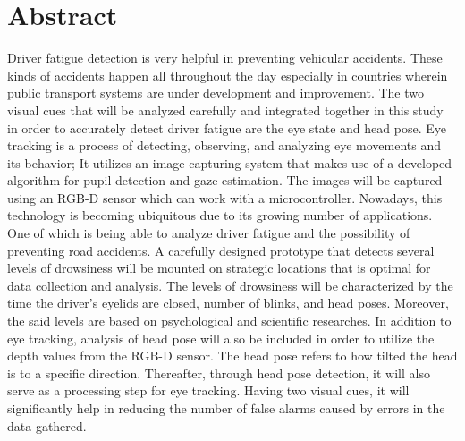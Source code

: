 \chapter*{Abstract}

\begin{comment}
Keep your abstract short by giving the gist/nutshell of your \MakeTextLowercase{\documentType}.	 Use the following checklist questions to help you in crafting your abstract.	

\begin{itemize}
	\item[$\square$] Did you briefly state what you intend to do?  
	\item[$\square$] Did you concisely discuss the problem statement?
	\item[$\square$] Did you tersely mention the objectives in general terms? 
	\item[$\square$] Did you succinctly describe the methodology for the target audience?
	\item[$\square$] Did you strongly describe your significant results and your conclusions?
\end{itemize}
\end{comment}
 Driver fatigue detection is very helpful in preventing vehicular accidents. These kinds of accidents happen all throughout the day especially in countries wherein public transport systems are under development and improvement. The two visual cues that will be analyzed carefully and integrated together in this study in order to accurately detect driver fatigue are the eye state and head pose. Eye tracking is a process of detecting, observing, and analyzing eye movements and its behavior; It utilizes an image capturing system that makes use of a developed algorithm for pupil detection and gaze estimation.  The images will be captured using an RGB-D sensor which can work with a microcontroller. Nowadays, this technology is becoming ubiquitous due to its growing number of applications. One of which is being able to analyze driver fatigue and the possibility of preventing road accidents. A carefully designed prototype that detects several levels of drowsiness will be mounted on strategic locations that is optimal for data collection and analysis. The levels of drowsiness will be characterized by the time the driver’s eyelids are closed, number of blinks, and head poses. Moreover, the said levels are based on psychological and scientific researches. In addition to eye tracking, analysis of head pose will also be included in order to utilize the depth values from the RGB-D sensor. The head pose refers to how tilted the head is to a specific direction. Thereafter, through head pose detection, it will also serve as a processing step for eye tracking. Having two visual cues, it will significantly help in reducing the number of false alarms caused by errors in the data gathered.



